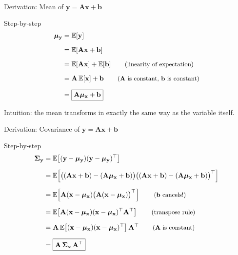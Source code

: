 \documentclass[aspectratio=169, 11pt]{beamer}
\newcommand{\E}{\mathbb{E}}
\newcommand{\T}{^{\top}}
\begin{document}
\begin{frame}{Derivation: Mean of $\mathbf{y} = \mathbf{A}\mathbf{x} + \mathbf{b}$}

\begin{block}{Step-by-step}
\begin{align*}
\bm{\mu}_{\mathbf{y}} &= \E[\mathbf{y}] \\[6pt]
&= \E[\mathbf{A}\mathbf{x} + \mathbf{b}] \\[6pt]
&= \E[\mathbf{A}\mathbf{x}] + \E[\mathbf{b}]
  \qquad \text{\small (linearity of expectation)} \\[6pt]
&= \mathbf{A}\,\E[\mathbf{x}] + \mathbf{b}
  \qquad \text{\small ($\mathbf{A}$ is constant, $\mathbf{b}$ is constant)} \\[6pt]
&= \boxed{\mathbf{A}\bm{\mu}_{\mathbf{x}} + \mathbf{b}}
\end{align*}
\end{block}

\vspace{6pt}
Intuition: the mean transforms in exactly the same way as the variable itself.

\end{frame}

\begin{frame}{Derivation: Covariance of $\mathbf{y} = \mathbf{A}\mathbf{x} + \mathbf{b}$}

\begin{block}{Step-by-step}
\begin{align*}
\bm{\Sigma}_{\mathbf{y}}
  &= \E\!\left[(\mathbf{y} - \bm{\mu}_{\mathbf{y}})(\mathbf{y} - \bm{\mu}_{\mathbf{y}})\T\right] \\[6pt]
  &= \E\!\left[\bigl((\mathbf{A}\mathbf{x}+\mathbf{b}) - (\mathbf{A}\bm{\mu}_{\mathbf{x}}+\mathbf{b})\bigr)
    \bigl((\mathbf{A}\mathbf{x}+\mathbf{b}) - (\mathbf{A}\bm{\mu}_{\mathbf{x}}+\mathbf{b})\bigr)\T\right] \\[6pt]
  &= \E\!\left[\mathbf{A}(\mathbf{x} - \bm{\mu}_{\mathbf{x}})
    \bigl(\mathbf{A}(\mathbf{x}-\bm{\mu}_{\mathbf{x}})\bigr)\T\right]
    \qquad \text{\small ($\mathbf{b}$ cancels!)} \\[6pt]
  &= \E\!\left[\mathbf{A}(\mathbf{x}-\bm{\mu}_{\mathbf{x}})
    (\mathbf{x}-\bm{\mu}_{\mathbf{x}})\T \mathbf{A}\T\right]
    \qquad \text{\small (transpose rule)} \\[6pt]
  &= \mathbf{A}\,\E\!\left[(\mathbf{x}-\bm{\mu}_{\mathbf{x}})
    (\mathbf{x}-\bm{\mu}_{\mathbf{x}})\T\right]\mathbf{A}\T
    \qquad \text{\small ($\mathbf{A}$ is constant)} \\[6pt]
  &= \boxed{\mathbf{A}\,\bm{\Sigma}_{\mathbf{x}}\,\mathbf{A}\T}
\end{align*}
\end{block}

\end{frame}
\end{document}
